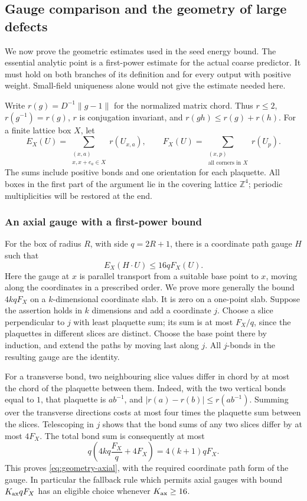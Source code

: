 \subsection{Gauge comparison and the geometry of large defects}
\label{sec:seed-geometry}
We now prove the geometric estimates used in the seed energy bound.
The essential analytic point is a first-power estimate for the actual
coarse predictor. It must hold on both branches of its definition and
for every output with positive weight. Small-field uniqueness alone
would not give the estimate needed here.

Write $r(g)=D^{-1}\|g-1\|$ for the normalized matrix chord. Thus
$r\le2$, $r(g^{-1})=r(g)$, $r$ is conjugation invariant, and
$r(gh)\le r(g)+r(h)$. For a finite lattice box $X$, let
\[
 E_X(U)=\sum_{\substack{(x,a)\\x,x+e_a\in X}}r(U_{x,a}),\qquad
 F_X(U)=\sum_{\substack{(x,p)\\\text{all corners in }X}}r(U_p).
\]
The sums include positive bonds and one orientation for each plaquette.
All boxes in the first part of the argument lie in the covering lattice
$\mathbb Z^4$; periodic multiplicities will be restored at the end.

\subsubsection{An axial gauge with a first-power bound}
For the box of radius $R$, with side $q=2R+1$, there is a coordinate
path gauge $H$ such that
\begin{equation}\label{eq:geometry-axial}
 E_X(H\cdot U)\le16q F_X(U).
\end{equation}
Here the gauge at $x$ is parallel transport from a suitable base point
to $x$, moving along the coordinates in a prescribed order. We prove
more generally the bound $4kqF_X$ on a $k$-dimensional coordinate slab.
It is zero on a one-point slab. Suppose the assertion holds in $k$
dimensions and add a coordinate $j$. Choose a slice perpendicular to
$j$ with least plaquette sum; its sum is at most $F_X/q$, since the
plaquettes in different slices are distinct. Choose the base point
there by induction, and extend the paths by moving last along $j$.
All $j$-bonds in the resulting gauge are the identity.

For a transverse bond, two neighbouring slice values differ in chord
by at most the chord of the plaquette between them. Indeed, with the
two vertical bonds equal to $1$, that plaquette is $ab^{-1}$, and
$|r(a)-r(b)|\le r(ab^{-1})$. Summing over the transverse directions
costs at most four times the plaquette sum between the slices.
Telescoping in $j$ shows that the bond sums of any two slices differ
by at most $4F_X$. The total bond sum is consequently at most
\[
 q\left(4kq\frac{F_X}{q}+4F_X\right)=4(k+1)qF_X.
\]
This proves \eqref{eq:geometry-axial}, with the required coordinate
path form of the gauge. In particular the fallback rule which permits
axial gauges with bound $K_{\rm ax}qF_X$ has an eligible choice whenever
$K_{\rm ax}\ge16$.

